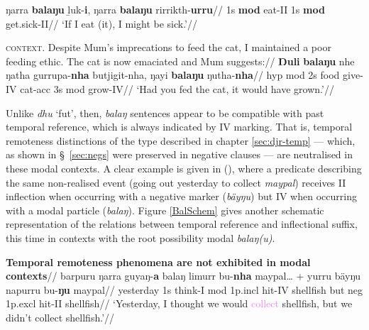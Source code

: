 \a\begingl\gla ŋarra \textbf{balaŋu} ḻuk-\textbf{i}, ŋarra \textbf{balaŋu} rirrikth-\textbf{urru}//
\glb 1s \textbf{\gls{mod}} eat-\gls{II} 1s \textbf{\gls{mod}} get.sick-\gls{II}//
\glft`If I eat (it), I might be sick.'//\endgl

\a\begingl\glpreamble \textsc{context.} Despite Mum's imprecations to feed the cat, I maintained a poor feeding ethic. The cat is now emaciated and Mum suggests:\footnotemark{}//
\gla \textbf{Ŋuli} \textbf{balaŋu} nhe ŋatha gurrupa-\textbf{nha} butjigit-nha, ŋayi \textbf{balaŋu} ŋutha-\textbf{nha}//
\glb \gls{hyp} \gls{mod} 2s food give-\gls{IV} cat-\gls{acc} 3s \gls{mod} grow-\gls{IV}//
\glft`Had you fed the cat, it would have grown.'\trailingcitation{[DhG~20190405]}//\endgl

\xe
{}%

Unlike \textit{dhu} `\gls{fut}', then, \textit{balaŋ} sentences appear to be compatible with past temporal reference, which is always indicated by \gls{IV} marking. That is, temporal remoteness distinctions of the type described in chapter \ref{sec:djr-temp} --- which, as shown in \S~\ref{sec:negs} were preserved in negative clauses --- are neutralised in these modal contexts. A clear example is given in (\nextx), where a predicate describing the same non-realised event (going out \textsf{yesterday} to collect \textit{maypal}) receives \gls{II} inflection when occurring with a negative marker (\textit{bäyŋu}) but \gls{IV} when occurring with a modal particle (\textit{balaŋ}). Figure \ref{BalSchem} gives another schematic representation of the relations between temporal reference and inflectional suffix, this time in contexts with the root possibility modal \textit{balaŋ(u)}.



\pex\begingl\glpreamble\textbf{Temporal remoteness phenomena are not exhibited in modal contexts}\label{MODvNEG}//
\gla barpuru ŋarra guyaŋ-\textbf{a} balaŋ limurr bu-\textbf{nha} maypal… + yurru bäyŋu napurru bu-\textbf{ŋu} maypal//
\glb yesterday 1s think-\gls{I} \gls{mod} 1p.\gls{incl} hit-\gls{IV} shellfish but \gls{neg} 1p.\gls{excl} hit-\gls{II} shellfish//
\glft`Yesterday, I \textcolor{forest}{thought} we would \textcolor{violet}{collect} shellfish, but we didn't \textcolor{ochre}{collect} shellfish.'\trailingcitation{[AW~20190429]}//\endgl\xe


